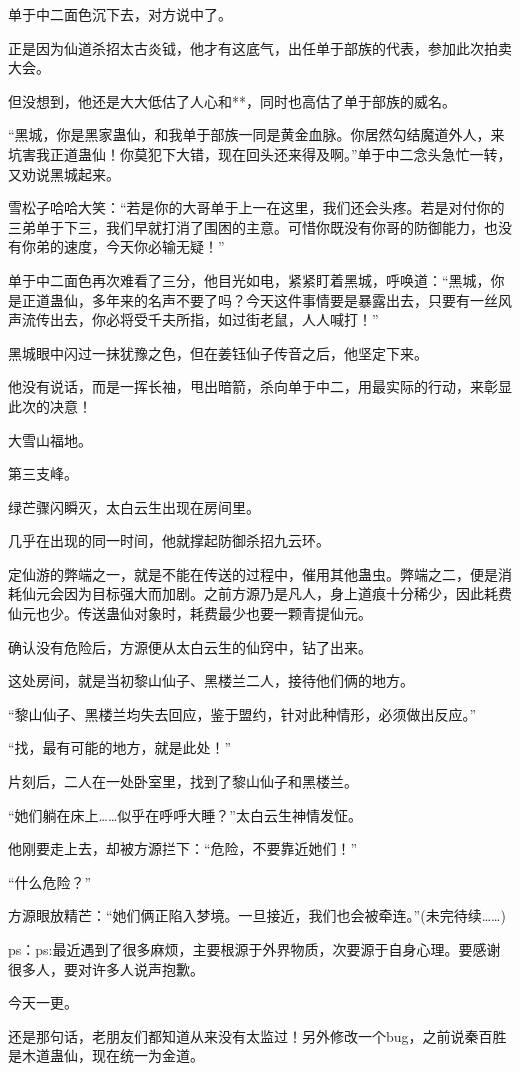 \begin{this_body}
单于中二面色沉下去，对方说中了。

正是因为仙道杀招太古炎钺，他才有这底气，出任单于部族的代表，参加此次拍卖大会。

但没想到，他还是大大低估了人心和**，同时也高估了单于部族的威名。

“黑城，你是黑家蛊仙，和我单于部族一同是黄金血脉。你居然勾结魔道外人，来坑害我正道蛊仙！你莫犯下大错，现在回头还来得及啊。”单于中二念头急忙一转，又劝说黑城起来。

雪松子哈哈大笑：“若是你的大哥单于上一在这里，我们还会头疼。若是对付你的三弟单于下三，我们早就打消了围困的主意。可惜你既没有你哥的防御能力，也没有你弟的速度，今天你必输无疑！”

单于中二面色再次难看了三分，他目光如电，紧紧盯着黑城，呼唤道：“黑城，你是正道蛊仙，多年来的名声不要了吗？今天这件事情要是暴露出去，只要有一丝风声流传出去，你必将受千夫所指，如过街老鼠，人人喊打！”

黑城眼中闪过一抹犹豫之色，但在姜钰仙子传音之后，他坚定下来。

他没有说话，而是一挥长袖，甩出暗箭，杀向单于中二，用最实际的行动，来彰显此次的决意！

大雪山福地。

第三支峰。

绿芒骤闪瞬灭，太白云生出现在房间里。

几乎在出现的同一时间，他就撑起防御杀招九云环。

定仙游的弊端之一，就是不能在传送的过程中，催用其他蛊虫。弊端之二，便是消耗仙元会因为目标强大而加剧。之前方源乃是凡人，身上道痕十分稀少，因此耗费仙元也少。传送蛊仙对象时，耗费最少也要一颗青提仙元。

确认没有危险后，方源便从太白云生的仙窍中，钻了出来。

这处房间，就是当初黎山仙子、黑楼兰二人，接待他们俩的地方。

“黎山仙子、黑楼兰均失去回应，鉴于盟约，针对此种情形，必须做出反应。”

“找，最有可能的地方，就是此处！”

片刻后，二人在一处卧室里，找到了黎山仙子和黑楼兰。

“她们躺在床上……似乎在呼呼大睡？”太白云生神情发怔。

他刚要走上去，却被方源拦下：“危险，不要靠近她们！”

“什么危险？”

方源眼放精芒：“她们俩正陷入梦境。一旦接近，我们也会被牵连。”(未完待续……)

ps：ps:最近遇到了很多麻烦，主要根源于外界物质，次要源于自身心理。要感谢很多人，要对许多人说声抱歉。

今天一更。

还是那句话，老朋友们都知道从来没有太监过！另外修改一个bug，之前说秦百胜是木道蛊仙，现在统一为金道。

\end{this_body}


